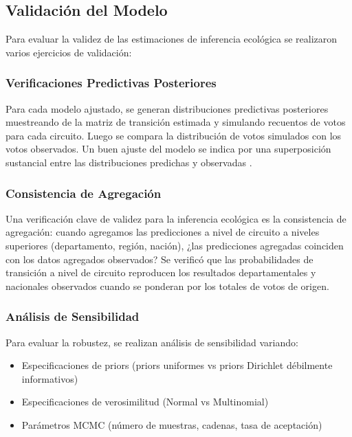 \subsection{Validación del Modelo}

Para evaluar la validez de las estimaciones de inferencia ecológica se realizaron varios ejercicios de validación:

\subsubsection{Verificaciones Predictivas Posteriores}

Para cada modelo ajustado, se generan distribuciones predictivas posteriores muestreando de la matriz de transición estimada y simulando recuentos de votos para cada circuito. Luego se compara la distribución de votos simulados con los votos observados. Un buen ajuste del modelo se indica por una superposición sustancial entre las distribuciones predichas y observadas \cite{gelman2013bayesian}.

\subsubsection{Consistencia de Agregación}

Una verificación clave de validez para la inferencia ecológica es la consistencia de agregación: cuando agregamos las predicciones a nivel de circuito a niveles superiores (departamento, región, nación), ¿las predicciones agregadas coinciden con los datos agregados observados? Se verificó que las probabilidades de transición a nivel de circuito reproducen los resultados departamentales y nacionales observados cuando se ponderan por los totales de votos de origen.

\subsubsection{Análisis de Sensibilidad}

Para evaluar la robustez, se realizan análisis de sensibilidad variando:
\begin{itemize}
    \item Especificaciones de priors (priors uniformes vs priors Dirichlet débilmente informativos)
    \item Especificaciones de verosimilitud (Normal vs Multinomial)
    \item Parámetros MCMC (número de muestras, cadenas, tasa de aceptación)
\end{itemize}

